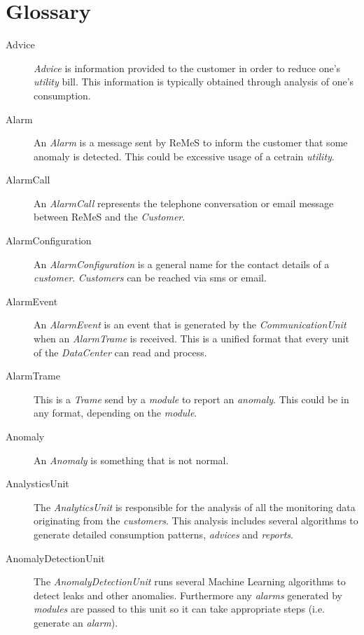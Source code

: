 \chapter{Glossary}
\label{chap:glossary}

\begin{description}
\item[Advice] \emph{Advice} is information provided to the customer in order
to reduce one's \emph{utility} bill. This information is typically obtained through
analysis of one's consumption.

\item[Alarm] An \emph{Alarm} is a message sent by ReMeS to inform the customer
that some anomaly is detected. This could be excessive usage of a cetrain
\emph{utility}.

\item[AlarmCall] An \emph{AlarmCall} represents the telephone conversation or
email message between ReMeS and the \emph{Customer}.

\item[AlarmConfiguration] An \emph{AlarmConfiguration} is a general name for the
contact details of a \emph{customer}. \emph{Customers} can be reached via sms or
email.

\item[AlarmEvent] An \emph{AlarmEvent} is an event that is generated by the
\emph{CommunicationUnit} when an \emph{AlarmTrame} is received. This is a
unified format that every unit of the \emph{DataCenter} can read and process.

\item[AlarmTrame] This is a \emph{Trame} send by a \emph{module} to report an
\emph{anomaly}. This could be in any format, depending on the \emph{module}.

\item[Anomaly] An \emph{Anomaly} is something that is not normal.

\item[AnalysticsUnit] The \emph{AnalyticsUnit} is responsible for the analysis
of all the monitoring data originating from the \emph{customers}. This analysis
includes several algorithms to generate detailed consumption patterns,
\emph{advices} and \emph{reports}. 

\item[AnomalyDetectionUnit] The \emph{AnomalyDetectionUnit} runs several
Machine Learning algorithms to detect leaks and other anomalies. Furthermore any
\emph{alarms} generated by \emph{modules} are passed to this unit so it can take
appropriate steps (i.e. generate an \emph{alarm}).


\end{description}
